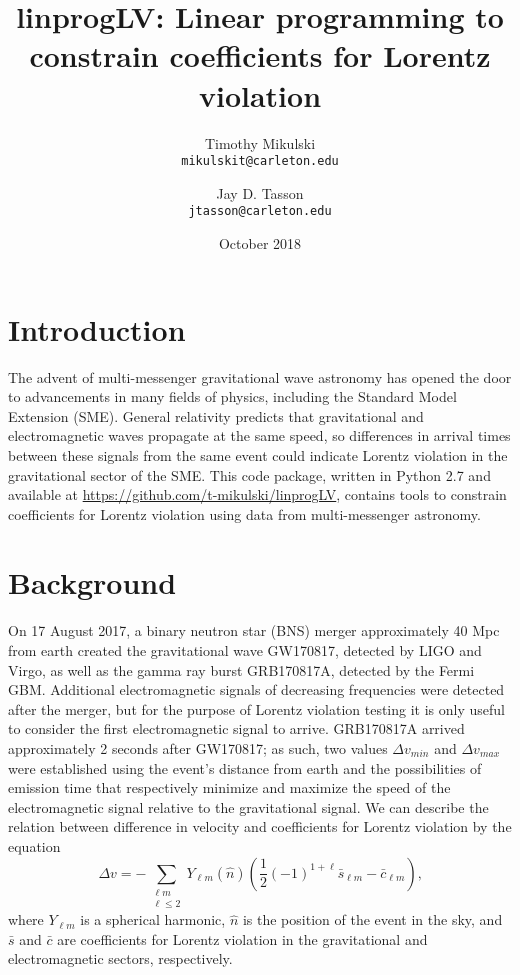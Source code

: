 \documentclass[11pt,notitlepage]{article}
\title{linprogLV: Linear programming to constrain coefficients for Lorentz violation}
\author{Timothy Mikulski\\
\texttt{mikulskit@carleton.edu}
\and
Jay D. Tasson\\
\texttt{jtasson@carleton.edu}
}
\date{October 2018}
\begin{document}
\maketitle

\section{Introduction}

The advent of multi-messenger gravitational wave astronomy has opened the door to advancements in many fields of physics, including the Standard Model Extension (SME). General relativity predicts that gravitational and electromagnetic waves propagate at the same speed, so differences in arrival times between these signals from the same event could indicate Lorentz violation in the gravitational sector of the SME. This code package, written in Python 2.7 and available at \url{https://github.com/t-mikulski/linprogLV}, contains tools to constrain coefficients for Lorentz violation using data from multi-messenger astronomy.

\section{Background}

On 17 August 2017, a binary neutron star (BNS) merger approximately 40 Mpc from earth created the gravitational wave GW170817, detected by LIGO and Virgo, as well as the gamma ray burst GRB170817A, detected by the Fermi GBM. Additional electromagnetic signals of decreasing frequencies were detected after the merger, but for the purpose of Lorentz violation testing it is only useful to consider the first electromagnetic signal to arrive. GRB170817A arrived approximately 2 seconds after GW170817; as such, two values $\Delta v_{min}$ and $\Delta v_{max}$ were established using the event's distance from earth and the possibilities of emission time that respectively minimize and maximize the speed of the electromagnetic signal relative to the gravitational signal. We can describe the relation between difference in velocity and coefficients for Lorentz violation by the equation
\begin{equation}
\label{eqn:dv}
\Delta v = - \sum_{\substack{\ell m \\ \ell \leq 2}}
Y_{\ell m}(\hat{n}) 
\left(\frac{1}{2} (-1)^{1+\ell} \bar{s}_{\ell m} - \bar{c}_{\ell m}\right)\text{,}
\end{equation}
where $Y_{\ell m}$ is a spherical harmonic, $\hat{n}$ is the position of the event in the sky, and $\bar{s}$ and $\bar{c}$ are coefficients for Lorentz violation in the gravitational and electromagnetic sectors, respectively.
\end{document}
